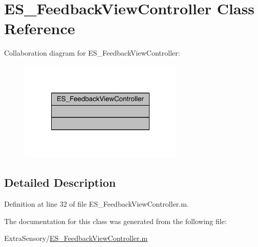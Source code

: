 \hypertarget{class_e_s___feedback_view_controller}{\section{E\+S\+\_\+\+Feedback\+View\+Controller Class Reference}
\label{class_e_s___feedback_view_controller}
}


Collaboration diagram for E\+S\+\_\+\+Feedback\+View\+Controller\+:\nopagebreak
\begin{figure}[H]
\begin{center}
\leavevmode
\includegraphics[width=222pt]{db/d5b/class_e_s___feedback_view_controller__coll__graph}
\end{center}
\end{figure}


\subsection{Detailed Description}


Definition at line 32 of file E\+S\+\_\+\+Feedback\+View\+Controller.\+m.



The documentation for this class was generated from the following file\+:\begin{DoxyCompactItemize}
\item 
Extra\+Sensory/\hyperlink{_e_s___feedback_view_controller_8m}{E\+S\+\_\+\+Feedback\+View\+Controller.\+m}\end{DoxyCompactItemize}
